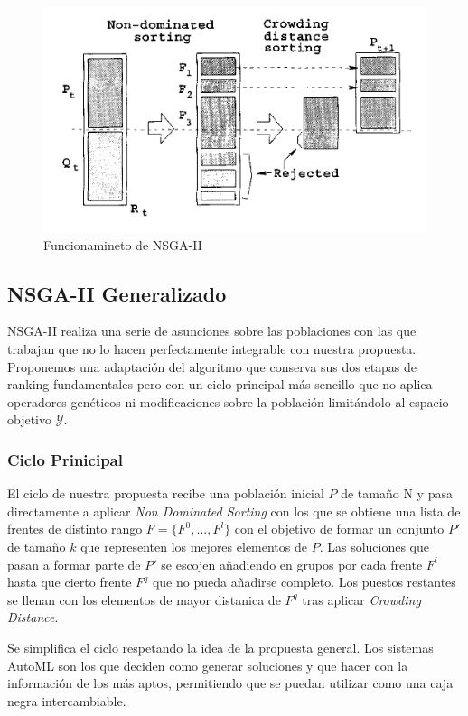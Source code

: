 \begin{figure}[ht]
    \centering
    \includegraphics[scale=0.5]{Pictures/nsga2.png}
    \caption{Funcionamineto de NSGA-II}
    \label{proposal:fig:nsga2}
\end{figure}

\subsection{NSGA-II Generalizado}

NSGA-II realiza una serie de asunciones sobre las poblaciones con las que trabajan que no lo hacen perfectamente integrable con nuestra propuesta. Proponemos una adaptaci\'on del algoritmo que conserva sus dos etapas de ranking fundamentales pero con un ciclo principal m\'as sencillo que no aplica operadores gen\'eticos ni modificaciones sobre la poblaci\'on limit\'andolo al espacio objetivo $\mathcal{Y}$.

\subsubsection{Ciclo Prinicipal}
El ciclo de nuestra propuesta recibe una poblaci\'on inicial $P$ de tama\~no N y pasa directamente a aplicar \textit{Non Dominated Sorting} con los que se obtiene una lista de frentes de distinto rango $F = \{F^0, ..., F^l\}$ con el objetivo de formar un conjunto $P'$ de tama\~no $k$ que representen los mejores elementos de $P$. Las soluciones que pasan a formar parte de $P'$ se escojen a\~nadiendo en grupos por cada frente $F^i$ hasta que cierto frente $F^q$ que no pueda a\~nadirse completo. Los puestos restantes se llenan con los elementos de mayor distanica de $F^q$ tras aplicar \textit{Crowding Distance}.

Se simplifica el ciclo respetando la idea de la propuesta general.  Los sistemas AutoML son los que deciden como generar soluciones y que hacer con la informaci\'on de los m\'as aptos, permitiendo que se puedan utilizar como una caja negra intercambiable.
